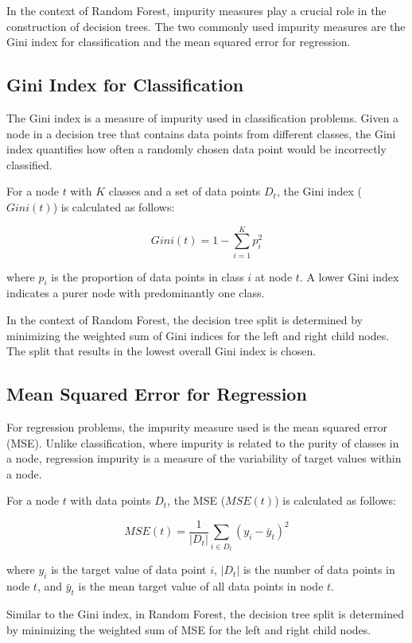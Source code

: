 \documentclass[12pt]{article}
\begin{document}
In the context of Random Forest, impurity measures play a crucial role in the construction of decision trees. The two commonly used impurity measures are the Gini index for classification and the mean squared error for regression.

\subsection{Gini Index for Classification}

The Gini index is a measure of impurity used in classification problems. Given a node in a decision tree that contains data points from different classes, the Gini index quantifies how often a randomly chosen data point would be incorrectly classified.

For a node \(t\) with \(K\) classes and a set of data points \(D_t\), the Gini index (\(Gini(t)\)) is calculated as follows:

\[ Gini(t) = 1 - \sum_{i=1}^{K} p_i^2 \]

where \(p_i\) is the proportion of data points in class \(i\) at node \(t\). A lower Gini index indicates a purer node with predominantly one class.

In the context of Random Forest, the decision tree split is determined by minimizing the weighted sum of Gini indices for the left and right child nodes. The split that results in the lowest overall Gini index is chosen.

\subsection{Mean Squared Error for Regression}

For regression problems, the impurity measure used is the mean squared error (MSE). Unlike classification, where impurity is related to the purity of classes in a node, regression impurity is a measure of the variability of target values within a node.

For a node \(t\) with data points \(D_t\), the MSE (\(MSE(t)\)) is calculated as follows:

\[ MSE(t) = \frac{1}{|D_t|} \sum_{i \in D_t} (y_i - \bar{y}_t)^2 \]

where \(y_i\) is the target value of data point \(i\), \(|D_t|\) is the number of data points in node \(t\), and \(\bar{y}_t\) is the mean target value of all data points in node \(t\).

Similar to the Gini index, in Random Forest, the decision tree split is determined by minimizing the weighted sum of MSE for the left and right child nodes.
\end{document}
